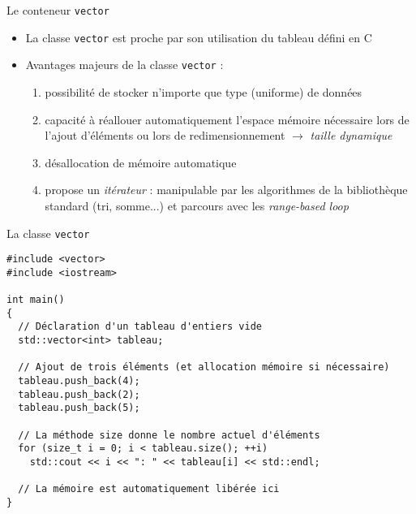 \documentclass[c]{beamer}
\begin{document}

\begin{frame}[fragile]{Le conteneur \texttt{vector}}
 \begin{itemize}
\item La classe \texttt{vector} est proche par son utilisation du tableau défini en C

\item Avantages majeurs de la classe \texttt{vector} :

\begin{enumerate}
\item possibilité de stocker n'importe que type (uniforme) de données

\item capacité à réallouer automatiquement l'espace mémoire nécessaire lors de l'ajout d'éléments ou lors de redimensionnement $\rightarrow$ \emph{taille dynamique}

\item désallocation de mémoire automatique

\item propose un \emph{itérateur} : manipulable par les algorithmes de la bibliothèque standard (tri, somme...) et parcours avec les \emph{range-based loop}
\end{enumerate}
\end{itemize}
\end{frame}

\begin{frame}[fragile]{La classe \texttt{vector}}

\begin{verbatim}
#include <vector>
#include <iostream>

int main()
{
  // Déclaration d'un tableau d'entiers vide
  std::vector<int> tableau;

  // Ajout de trois éléments (et allocation mémoire si nécessaire)
  tableau.push_back(4);
  tableau.push_back(2);
  tableau.push_back(5);

  // La méthode size donne le nombre actuel d'éléments
  for (size_t i = 0; i < tableau.size(); ++i)
    std::cout << i << ": " << tableau[i] << std::endl;

  // La mémoire est automatiquement libérée ici
}
\end{verbatim}
\end{frame}
\end{document}
